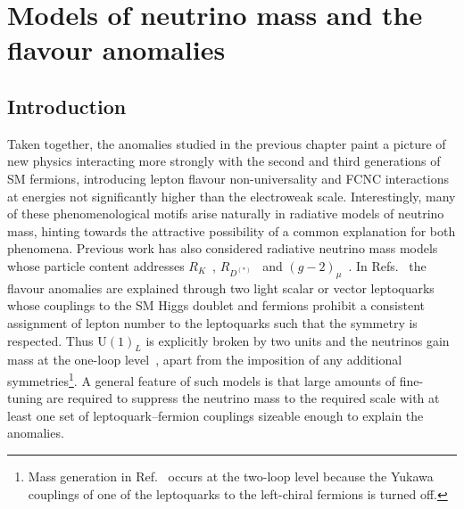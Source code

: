 \graphicspath{{img/chapter_4/}}

\chapter{Models of neutrino mass and the flavour anomalies}
\label{chapter:neutrino-mass-and-flavour-anomalies}

\section{Introduction}

Taken together, the anomalies studied in the previous chapter paint a picture of
new physics interacting more strongly with the second and third generations of
SM fermions, introducing lepton flavour non-universality and FCNC interactions
at energies not significantly higher than the electroweak scale. Interestingly,
many of these phenomenological motifs arise naturally in radiative models of
neutrino mass, hinting towards the attractive possibility of a common
explanation for both phenomena. Previous work has also considered radiative
neutrino mass models whose particle content addresses $R_{K}$~\cite{Pas:2015hca,
  Cheung:2016fjo, Cheung:2017efc, Cheung:2016frv, Popov:2016fzr},
$R_{D^{(*)}}$~\cite{Deppisch:2016qqd, Popov:2016fzr} and
$(g-2)_\mu$~\cite{Babu:2010vp, Cheung:2016fjo, Cheung:2017efc, Cheung:2016frv,
  Popov:2016fzr}. In Refs.~\cite{Pas:2015hca, Deppisch:2016qqd} the flavour
anomalies are explained through two light scalar or vector leptoquarks whose
couplings to the SM Higgs doublet and fermions prohibit a consistent assignment
of lepton number to the leptoquarks such that the symmetry is respected. Thus
$\mathrm{U}(1)_L$ is explicitly broken by two units and the neutrinos gain mass
at the one-loop level~\cite{AristizabalSierra:2007nf}, apart from the imposition
of any additional symmetries\footnote{Mass generation in Ref.~\cite{Babu:2010vp}
  occurs at the two-loop level because the Yukawa couplings of one of the
  leptoquarks to the left-chiral fermions is turned off.}. A general feature of
such models is that large amounts of fine-tuning are required to suppress the
neutrino mass to the required scale with at least one set of leptoquark--fermion
couplings sizeable enough to explain the anomalies.


